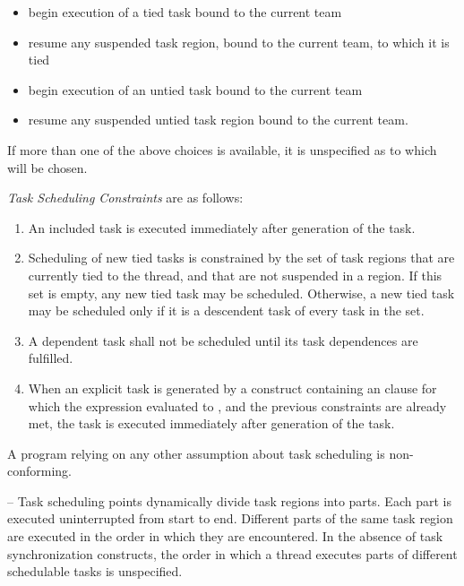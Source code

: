 \begin{itemize}
\item begin execution of a tied task bound to the current team

\item resume any suspended task region, bound to the current team, to which it is tied

\item begin execution of an untied task bound to the current team

\item resume any suspended untied task region bound to the current team.
\end{itemize}

If more than one of the above choices is available, it is unspecified as to which will be 
chosen.

\emph{Task Scheduling Constraints} are as follows:

\begin{enumerate}
\item An included task is executed immediately after generation of the task.

\item Scheduling of new tied tasks is constrained by the set of task regions that are currently 
tied to the thread, and that are not suspended in a  region. If this set is empty, 
any new tied task may be scheduled. Otherwise, a new tied task may be scheduled only 
if it is a descendent task of every task in the set.

\item A dependent task shall not be scheduled until its task dependences are fulfilled.

\item When an explicit task is generated by a construct containing an  clause for which the 
expression evaluated to , and the previous constraints are already met, the task is 
executed immediately after generation of the task.
\end{enumerate}

A program relying on any other assumption about task scheduling is non-conforming.

\notestart
\noteheader – Task scheduling points dynamically divide task regions into parts. Each part is 
executed uninterrupted from start to end. Different parts of the same task region are 
executed in the order in which they are encountered. In the absence of task 
synchronization constructs, the order in which a thread executes parts of different 
schedulable tasks is unspecified.

